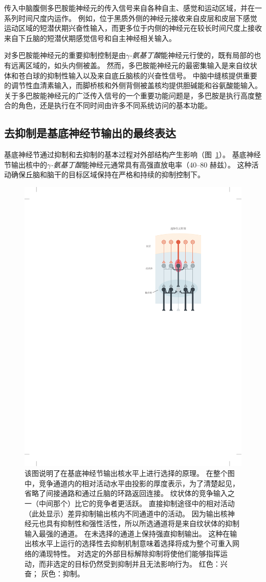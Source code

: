 传入中脑腹侧多巴胺能神经元的传入信号来自各种自主、感觉和运动区域，并在一系列时间尺度内运作。
例如，位于黑质外侧的神经元接收来自皮层和皮层下感觉运动区域的短潜伏期兴奋性输入，而更多位于内侧的神经元在较长时间尺度上接收来自下丘脑的短潜伏期感觉信号和自主神经相关输入。


对多巴胺能神经元的重要抑制控制是由\textit{$\gamma$-氨基丁酸}能神经元行使的，既有局部的也有远离区域的，如头内侧被盖。
然而，多巴胺能神经元的最密集输入是来自纹状体和苍白球的抑制性输入以及来自底丘脑核的兴奋性信号。
中脑中缝核提供重要的调节性血清素输入，而脚桥核和外侧背侧被盖核均提供胆碱能和谷氨酸能输入。
关于多巴胺能神经元的广泛传入信号的一个重要功能问题是，多巴胺是执行高度整合的角色，还是执行在不同时间由许多不同系统访问的基本功能。



\subsection{去抑制是基底神经节输出的最终表达}

基底神经节通过抑制和去抑制的基本过程对外部结构产生影响（图~\ref{fig:38_6}）。
基底神经节输出核中的\textit{$\gamma$-氨基丁酸}能神经元通常具有高强直放电率（40–80 赫兹）。
这种活动确保丘脑和脑干的目标区域保持在严格和持续的抑制控制下。


\begin{figure}[htbp]
	\centering
	\includegraphics[width=0.45\linewidth]{chap38/fig_38_6}
	\caption{该图说明了在基底神经节输出核水平上进行选择的原理。
		在整个图中，竞争通道内的相对活动水平由投影的厚度表示，为了清楚起见，省略了间接通路和通过丘脑的环路返回连接。
		纹状体的竞争输入之一（中间那个）比它的竞争者更活跃。
		直接抑制途径中的相对活动（此处显示）差异抑制输出核内不同通道中的活动。
		因为输出核神经元也具有抑制性和强性活性，所以所选通道将是来自纹状体的抑制输入最强的通道。
		在未选择的通道上保持强直抑制输出。
		这种在输出核水平上运行的选择性去抑制机制意味着选择将成为整个可重入网络的涌现特性。
		对选定的外部目标解除抑制将使他们能够指挥运动，而非选定的目标仍然受到抑制并且无法影响行为。 红色：兴奋； 灰色：抑制。}
	\label{fig:38_6}
\end{figure}


